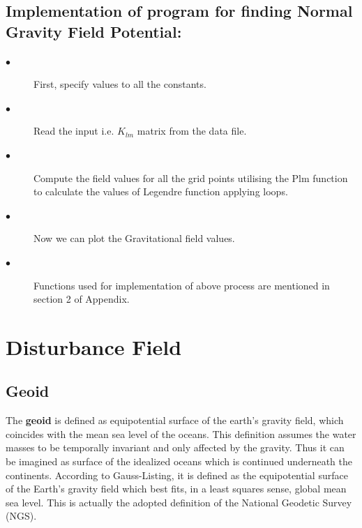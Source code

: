 \documentclass[a4paper,12pt]{report}
\begin{document}
\section{Implementation of program for finding Normal Gravity Field Potential:}
\begin{description}
\item[$\bullet$] First, specify values to all the constants.
\item[$\bullet$] Read the input i.e. $K_{lm}$ matrix from the data file.
\item[$\bullet$] Compute the field values for all the grid points utilising the Plm function to calculate the values of Legendre function applying loops.
\item[$\bullet$] Now we can plot the Gravitational field values.  
\item[$\bullet$]Functions used for implementation of above process are mentioned in section 2 of Appendix.
\end{description}   

\newpage
\chapter{Disturbance Field}
\section{Geoid}
The \textbf{geoid} is defined as equipotential surface of the earth’s gravity field, which coincides with the mean sea level of the oceans. This definition assumes the water masses to be temporally invariant and only affected by the gravity. Thus it can be imagined as surface of the idealized oceans which is continued underneath the continents. According to Gauss-Listing, it is defined as the equipotential surface of the Earth’s gravity field which best fits, in a least squares sense, global mean sea level. This is actually the adopted definition of the National Geodetic Survey (NGS).\\
\end{document}
